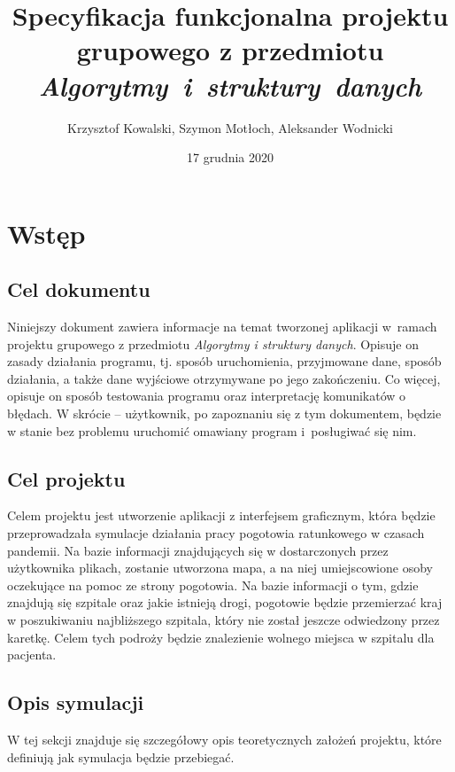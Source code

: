 \documentclass[12pt,a4paper]{article}
\title{Specyfikacja funkcjonalna projektu grupowego z przedmiotu \textit{Algorytmy~i~struktury~danych}}
\author{Krzysztof Kowalski, Szymon Motłoch, Aleksander Wodnicki}
\date{17 grudnia 2020}
\begin{document}
\maketitle
\thispagestyle{empty}
\newpage
\pagestyle{fancy}
\fancyhf{}
\tableofcontents
\newpage

\section{Wstęp}
\subsection{Cel dokumentu}
Niniejszy dokument zawiera informacje na temat tworzonej aplikacji w~ramach projektu grupowego z przedmiotu \textit{Algorytmy i struktury danych}. Opisuje on zasady działania programu, tj. sposób uruchomienia, przyjmowane dane, sposób działania, a także dane wyjściowe otrzymywane po jego zakończeniu. Co więcej, opisuje on sposób testowania programu oraz interpretację komunikatów o błędach. W skrócie – użytkownik, po zapoznaniu się z tym dokumentem, będzie w stanie bez problemu uruchomić omawiany program i~posługiwać się nim.

\subsection{Cel projektu}
Celem projektu jest utworzenie aplikacji z interfejsem graficznym, która będzie przeprowadzała symulacje działania pracy pogotowia ratunkowego w czasach pandemii. Na bazie informacji znajdujących się w dostarczonych przez użytkownika plikach, zostanie utworzona mapa, a na niej umiejscowione osoby oczekujące na pomoc ze strony pogotowia. Na bazie informacji o tym, gdzie znajdują się szpitale oraz jakie istnieją drogi, pogotowie będzie przemierzać kraj w poszukiwaniu najbliższego szpitala, który nie został jeszcze odwiedzony przez karetkę. Celem tych podroży będzie znalezienie wolnego miejsca w szpitalu dla pacjenta.

\subsection{Opis symulacji}
W tej sekcji znajduje się szczegółowy opis teoretycznych założeń projektu, które definiują jak symulacja będzie przebiegać.
\end{document}

